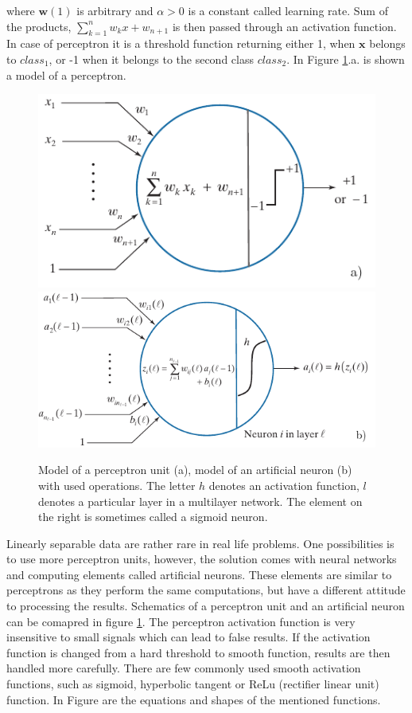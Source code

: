 where $\bm{w}(1)$ is arbitrary and $\alpha > 0$ is a constant called learning rate. Sum of the products, $\sum_{k=1}^{n}w_kx  + w_{n+1}$ is then passed through an activation function. In case of perceptron it is a threshold function returning either 1, when $\bm{x}$ belongs to $class_1$, or -1 when it belongs to the second class $class_2$. In Figure \ref*{img:percneuron}.a.
is shown a model of a perceptron.\cite{raisi2020text}

\begin{figure}[hbtp]
    \centering
    \includegraphics[scale=0.41]{obrazky/perceptron.png}
    \includegraphics[scale=0.41]{obrazky/artneuron.png}

    \caption{Model of a perceptron unit (a), model of an artificial neuron (b) with used operations. The letter $h$ denotes an activation function, $l$ denotes a particular layer in a multilayer network. The element on the right is sometimes called a sigmoid neuron.\cite{DIP}}
    \label{img:percneuron}
\end{figure}

Linearly separable data are rather rare in real life problems. One possibilities is to use more perceptron units, however, the solution comes with neural networks and computing elements called artificial neurons. These elements are similar to perceptrons as they perform the same computations, but have a different attitude to processing the results. Schematics of a perceptron unit and an artificial neuron can be comapred in figure \ref*{img:percneuron}.
The perceptron activation function is very insensitive to small signals which can lead to false results. If the activation function is changed from a hard threshold to smooth function, results are then handled more carefully. There are few commonly used smooth activation functions, such as sigmoid, hyperbolic tangent or ReLu (rectifier linear unit) function. In Figure %
are the equations and shapes of the mentioned functions.\cite{DIP}

